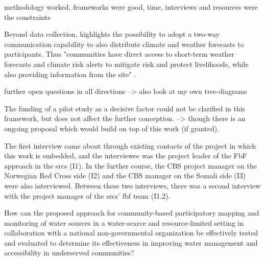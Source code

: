 methodology worked, frameworks were good, time, interviews and resources were the constraints



Beyond data collection, \autocite{gualazziniEWEAEarlyWarning2021} highlights the possibility to adopt a two-way communication capability to also distribute climate and weather forecasts to participants. Thus "communities have direct access to short-term weather forecasts and climate risk alerts to mitigate risk and protect livelihoods, while also providing information from the site" \autocite[20]{gualazziniEWEAEarlyWarning2021}. %


further open questions in all directions --> also look at my own tree-diagrams



The funding of a pilot study as a decisive factor could not be clarified in this framework, but does not affect the further conception. --> though there is an ongoing proposal which would build on top of this work (if granted).






The first interview came about through existing contacts of the project in which this work is embedded, and the interviewee was the project leader of the FbF approach in the \acrshort{srcs} (I1). In the further course, the CBS project manager on the Norwegian Red Cross side (I2) and the CBS manager on the Somali side (I3) were also interviewed. Between these two interviews, there was a second interview with the project manager of the \acrshort{srcs}' \acrshort{fbf} team (I1.2).




How can the proposed approach for community-based participatory mapping and monitoring of water sources in a water-scarce and resource-limited setting in collaboration with a national non-governmental organization be effectively tested and evaluated to determine its effectiveness in improving water management and accessibility in underserved communities?